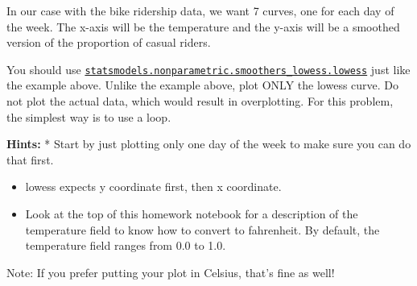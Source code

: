 \documentclass[11pt]{article}
\begin{document}
    In our case with the bike ridership data, we want 7 curves, one for each
day of the week. The x-axis will be the temperature and the y-axis will
be a smoothed version of the proportion of casual riders.

You should use
\href{http://www.statsmodels.org/dev/generated/statsmodels.nonparametric.smoothers_lowess.lowess.html}{\texttt{statsmodels.nonparametric.smoothers\_lowess.lowess}}
just like the example above. Unlike the example above, plot ONLY the
lowess curve. Do not plot the actual data, which would result in
overplotting. For this problem, the simplest way is to use a loop.

\textbf{Hints:} * Start by just plotting only one day of the week to
make sure you can do that first.

\begin{itemize}
\item
  lowess expects y coordinate first, then x coordinate.
\item
  Look at the top of this homework notebook for a description of the
  temperature field to know how to convert to fahrenheit. By default,
  the temperature field ranges from 0.0 to 1.0.
\end{itemize}

Note: If you prefer putting your plot in Celsius, that's fine as well!
\end{document}
